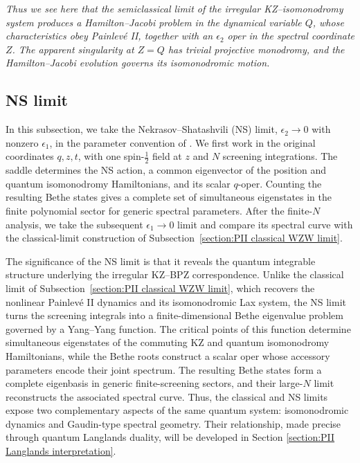 \documentclass[a4paper,11pt]{article}
\numberwithin{equation}{section}
\begin{document}
{\it Thus we see here that the semiclassical limit of the irregular KZ–isomonodromy system produces a Hamilton–Jacobi problem in the dynamical variable $Q$, whose characteristics obey Painlev\'e II, together with an $\epsilon_2$ oper in the spectral coordinate $Z$. The apparent singularity at $Z=Q$ has trivial projective monodromy, and the Hamilton–Jacobi evolution governs its isomonodromic motion.}

\subsection{NS limit}
\label{section:PII NS comparison}

In this subsection, we take the Nekrasov--Shatashvili (NS) limit,
$\epsilon_{2}\to0$ with nonzero $\epsilon_{1}$, in the
parameter convention of \cite{NekrasovShatashvili2009}.
We first work in the original coordinates $q,z,t$, with one
spin-$\frac{1}{2}$ field at $z$
and $N$ screening integrations.  The saddle
determines the NS action, a common eigenvector of the position
and quantum isomonodromy Hamiltonians, and its scalar $q$-oper.
Counting the resulting Bethe states gives a complete set of simultaneous
eigenstates in the finite polynomial sector for generic spectral parameters.
After the finite-$N$ analysis, we take the subsequent
$\epsilon_{1}\to0$ limit and compare its spectral curve with
the classical-limit construction of
Subsection~\ref{section:PII classical WZW limit}.

The significance of the NS limit is that it reveals the quantum integrable structure underlying the irregular KZ–BPZ correspondence. Unlike the classical limit of Subsection~\ref{section:PII classical WZW limit}, which recovers the nonlinear Painlev\'e II dynamics and its isomonodromic Lax system, the NS limit turns the screening integrals into a finite-dimensional Bethe eigenvalue problem governed by a Yang–Yang function. The critical points of this function determine simultaneous eigenstates of the commuting KZ and quantum isomonodromy Hamiltonians, while the Bethe roots construct a scalar oper whose accessory parameters encode their joint spectrum. The resulting Bethe states form a complete eigenbasis in generic finite-screening sectors, and their large-$N$ limit reconstructs the associated spectral curve. Thus, the classical and NS limits expose two complementary aspects of the same quantum system: isomonodromic dynamics and Gaudin-type spectral geometry. Their relationship, made precise through quantum Langlands duality, will be developed in Section \ref{section:PII Langlands interpretation}.
\end{document}
